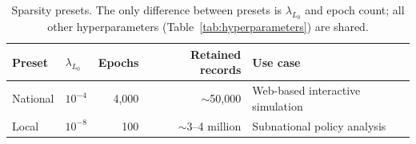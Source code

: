 \begin{table}[ht]
\centering
{\tablefont
\begin{tabular}{llrrl}
\toprule
Preset & $\lambda_{L_0}$ & Epochs & Retained records & Use case \\
\midrule
National & $10^{-4}$ & 4,000 & $\sim$50,000 & Web-based interactive simulation \\
Local & $10^{-8}$ & 100 & $\sim$3--4 million & Subnational policy analysis \\
\bottomrule
\end{tabular}
}
\caption{Sparsity presets. The only difference between presets is $\lambda_{L_0}$ and epoch count; all other hyperparameters (Table~\ref{tab:hyperparameters}) are shared.}
\label{tab:presets}
\end{table}
